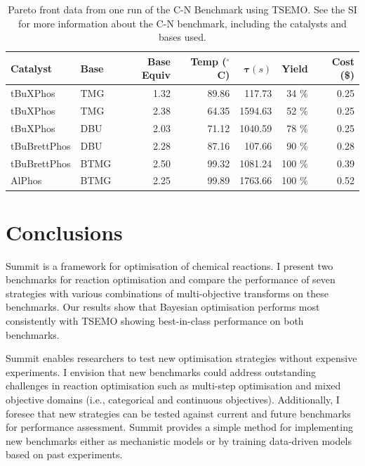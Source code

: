 \begin{table}[tb]
    \centering
    \caption{Pareto front data from one run of the C-N Benchmark using TSEMO. See the SI for more information about the C-N benchmark, including the catalysts and bases used.
    }
    \begin{tabular}{llrrrrr}
    \hline
         \textbf{Catalyst} &  \textbf{Base} & \textbf{Base Equiv} & \textbf{Temp ($^{\circ}$ C)} &       $\mathbf{\tau} (s)$ &     \textbf{Yield} &      \textbf{Cost (\$)} \\
    \hline
     tBuXPhos &   TMG &             1.32 &       89.86 &   117.73 &  34 \% &  0.25 \\
     tBuXPhos &   TMG &             2.38 &       64.35 &  1594.63 &  52 \% &  0.25 \\
     tBuXPhos &   DBU &             2.03 &       71.12 &  1040.59 &  78 \% &  0.25 \\
 tBuBrettPhos &   DBU &             2.28 &       87.16 &   107.66 &  90 \% &  0.28 \\
 tBuBrettPhos &  BTMG &             2.50 &       99.32 &  1081.24 &  100 \% &  0.39 \\
       AlPhos &  BTMG &             2.25 &       99.89 &  1763.66 &  100 \% &  0.52 \\
    \end{tabular}

    \label{tab:cn_benchmark_results}
\end{table}

\section{Conclusions}

Summit is a framework for optimisation of chemical reactions. I present two benchmarks for reaction optimisation and compare the performance of seven strategies with various combinations of multi-objective transforms on these benchmarks. Our results show that Bayesian optimisation performs most consistently with TSEMO showing best-in-class performance on both benchmarks.

Summit enables researchers to test new optimisation strategies without expensive experiments. I envision that new benchmarks could address outstanding challenges in reaction optimisation such as multi-step optimisation \cite{Coley2019, Clayton2020} and mixed objective domains (i.e., categorical and continuous objectives). Additionally, I foresee that new strategies can be tested against current and future benchmarks for performance assessment. Summit provides a simple method for implementing new benchmarks either as mechanistic models or by training data-driven models based on past experiments.

